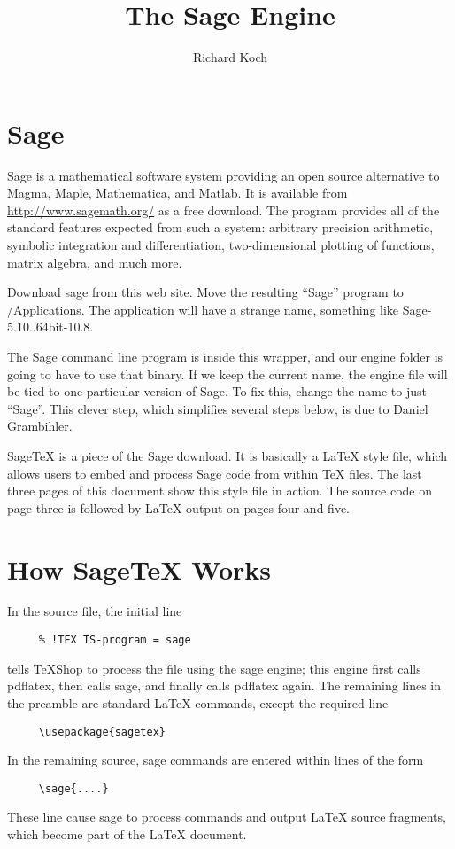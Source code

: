 \documentclass[11pt, oneside]{amsart}
\title{The Sage Engine}
\author{Richard Koch}
\begin{document}
\maketitle
\vspace{-.3in}
\section{Sage}
Sage is a mathematical software system providing an open source alternative to Magma, Maple, Mathematica, and Matlab. It is available from 
\url{http://www.sagemath.org/} as a free download. The program provides all of the standard features expected from such a system: arbitrary precision arithmetic, symbolic integration and differentiation, two-dimensional plotting of functions, matrix algebra, and much more.

Download sage from this web site. Move the resulting ``Sage'' program to /Applications. The
application will have a strange name, something like Sage-5.10..64bit-10.8.

The Sage command line program is inside this wrapper, and our engine folder is going to have
to use that binary. If we keep the current name, the engine file will be tied to one particular
version of Sage. To fix this, change the name to just ``Sage''. This clever step, which
simplifies several steps below, is due to Daniel Grambihler.

SageTeX is a piece of the Sage download. It is basically a LaTeX style file, which  allows users to embed and process Sage code from within TeX files. The last three pages of this document show this style file in action. The source code on page three is followed by LaTeX output on pages four and five.

\section{How SageTeX Works}

 In the source file, the initial line
\begin{verbatim}
     % !TEX TS-program = sage
\end{verbatim}
tells TeXShop to process the file using the sage engine; this engine first calls pdflatex, then calls sage, and finally calls pdflatex again.
The remaining lines in the preamble are standard LaTeX commands, except the required line
\begin{verbatim}
     \usepackage{sagetex}
\end{verbatim}
In the remaining source, sage commands are entered within lines of the form
\begin{verbatim}
     \sage{....}
\end{verbatim}
These line cause sage to process commands and output LaTeX source fragments, which become part of the LaTeX document.
\end{document}
